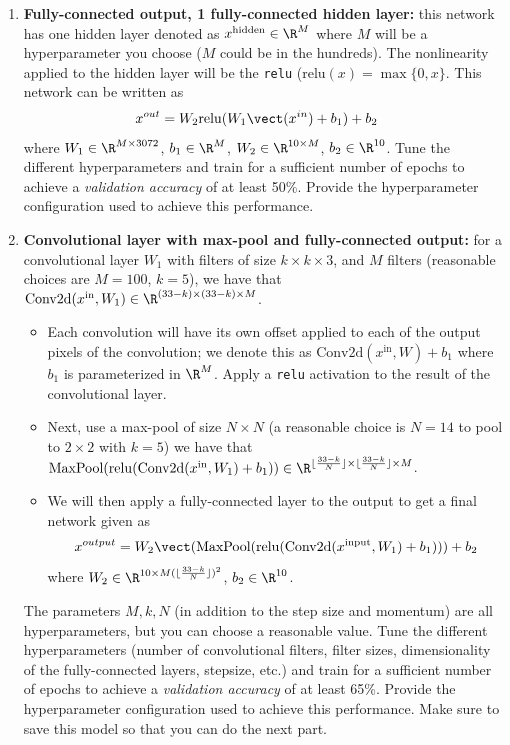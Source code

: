 \documentclass{article}
\begin{document}
\begin{bprob}
\begin{enumerate}
  \item {} \textbf{Fully-connected output, 1 fully-connected hidden layer:} this network has one hidden layer denoted as $x^\text{hidden} \in \R^{M}$ where $M$ will be a hyperparameter you choose ($M$ could be in the hundreds). The nonlinearity applied to the hidden layer will be the \texttt{relu} ($\mathrm{relu}(x) = \max\{0,x\}$. This network can be written as
  \begin{align*}
    x^{out} &= W_2 \mathrm{relu}(W_1 \vect(x^{in}) +b_1) + b_2
  \end{align*}
  where $W_1 \in \R^{M \times 3072}$, $b_1 \in \R^M$, $W_2 \in \R^{10 \times M}$, $b_2 \in \R^{10}$.
  Tune the different hyperparameters and train for a sufficient number of epochs to achieve a \emph{validation accuracy} of at least 50\%. Provide the hyperparameter configuration used to achieve this performance.
  \item {} \textbf{Convolutional layer with max-pool and fully-connected output:} for a convolutional layer $W_1$ with filters of size $k \times k \times 3$, and $M$ filters (reasonable choices are $M=100$, $k=5$), we have that $\mathrm{Conv2d}(x^\text{in}, W_1) \in \R^{(33-k) \times (33-k) \times M}$.
  
  \begin{itemize}
      \item Each convolution will have its own offset applied to each of the output pixels of the convolution; we denote this as $\mathrm{Conv2d}(x^\text{in}, W) + b_1$ where $b_1$ is parameterized in $\R^M$. Apply a \texttt{relu} activation to the result of the convolutional layer. 
      \item Next, use a max-pool of size $N \times N$ (a reasonable choice is $N=14$ to pool to $2 \times 2$ with $k=5$) we have that $\textrm{MaxPool}( \mathrm{relu}( \mathrm{Conv2d}(x^\text{in}, W_1)+b_1)) \in \R^{\lfloor\frac{33-k}{N}\rfloor \times \lfloor\frac{33-k}{N}\rfloor \times M}$.
      \item We will then apply a fully-connected layer to the output to get a final network given as
          \begin{align*}
          x^{output} = W_2 \vect(\textrm{MaxPool}( \mathrm{relu}( \mathrm{Conv2d}(x^\text{input}, W_1)+b_1))) + b_2
          \end{align*}
    where $W_2 \in \R^{10 \times M (\lfloor\frac{33-k}{N}\rfloor)^2}$, $b_2 \in \R^{10}$.
  \end{itemize}
  
  The parameters $M,k,N$ (in addition to the step size and momentum) are all hyperparameters, but you can choose a reasonable value. Tune the different hyperparameters (number of convolutional filters, filter sizes, dimensionality of the fully-connected layers, stepsize, etc.) and train for a sufficient number of epochs to achieve a \emph{validation accuracy} of at least 65\%. Provide the hyperparameter configuration used to achieve this performance.
Make sure to save this model so that you can do the next part.
  

\end{enumerate}
\end{bprob}
\end{document}
